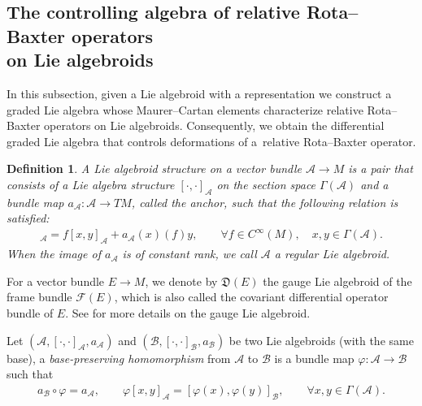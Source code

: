 \documentclass[pdftex]{sigma}%
\numberwithin{equation}{section}
\newtheorem{defi}[thm]{Definition}
\newcommand{\huaA}{\mathcal{A}}
\newcommand{\huaB}{\mathcal{B}}
\newcommand{\huaF}{\mathcal{F}}
\newcommand{\frkD}{\mathfrak D}
\newcommand{\CWM}{C^{\infty}(M)}
\begin{document}
\subsection[The controlling algebra of relative Rota--Baxter operators on Lie algebroids]
{The controlling algebra of relative Rota--Baxter operators \\on Lie algebroids}

In this subsection, given a Lie algebroid with a representation we construct a graded Lie algebra whose Maurer--Cartan elements characterize relative Rota--Baxter operators on Lie algebroids. Consequently, we obtain the differential graded Lie algebra that controls deformations of a~rela\-tive Rota--Baxter operator.

\begin{defi}
A {\it Lie algebroid} structure on a vector bundle $\huaA\longrightarrow M$ is
a pair that consists of a Lie algebra structure $[\cdot,\cdot]_\huaA$ on
the section space $\Gamma(\huaA)$ and a bundle map
$a_\huaA\colon \huaA\longrightarrow TM$, called the anchor, such that the
following relation is satisfied:
\begin{gather*}
[x,fy]_\huaA=f[x,y]_\huaA+a_\huaA(x)(f)y,\qquad \forall f\in
\CWM,\quad x,y\in\Gamma(\huaA).
\end{gather*}
When the image of $a_\huaA$ is of constant rank, we call $\huaA$ a {\it regular Lie algebroid}.
\end{defi}

For a vector bundle $E\longrightarrow M$, we denote by $\frkD(E)$ the gauge Lie algebroid of the frame bundle $\huaF(E)$, which is also called the covariant differential operator bundle of $E$. See \cite{General-theory-of-Lie-groupoid-and-Lie-algebroid} for more details on the gauge Lie algebroid.

Let $(\huaA,[\cdot,\cdot]_\huaA,a_\huaA)$ and $(\huaB,[\cdot,\cdot]_\huaB,a_\huaB)$ be two Lie
algebroids (with the same base), a {\it base-preserving homomorphism}
from $\huaA$ to $\huaB$ is a bundle map $\varphi\colon \huaA\longrightarrow \huaB$ such
that
\begin{eqnarray*}
 a_\huaB\circ\varphi=a_\huaA,\qquad
 \varphi[x,y]_\huaA=[\varphi(x),\varphi(y)]_\huaB,\qquad \forall x,y\in\Gamma(\huaA).
\end{eqnarray*}
\end{document}
